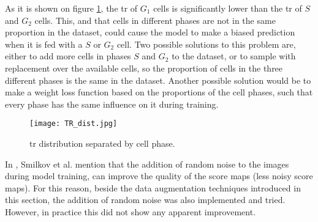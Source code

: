 As it is shown on figure \ref{fig:dataset:discus:tr_dist}, the \gls{tr} of $G_1$ cells is significantly lower than the \gls{tr} of $S$ and $G_2$ cells. This, and that cells in different phases are not in the same proportion in the dataset, could cause the model to make a biased prediction when it is fed with a $S$ or $G_2$ cell. Two possible solutions to this problem are, either to add more cells in phases $S$ and $G_2$ to the dataset, or to sample with replacement over the available cells, so the proportion of cells in the three different phases is the same in the dataset. Another possible solution would be to make a weight loss function based on the proportions of the cell phases, such that every phase has the same influence on it during training.

\begin{figure}[htb]
  \centering
  \texttt{[image: TR\_dist.jpg]}
  \caption{\gls{tr} distribution separated by cell phase.}
  \label{fig:dataset:discus:tr_dist}
\end{figure}

In \cite{Smilkov_smoothgrad}, Smilkov et al. mention that the addition of random noise to the images during model training, can improve the quality of the score maps (less noisy score maps). For this reason, beside the data augmentation techniques introduced in this section, the addition of random noise was also implemented and tried. However, in practice this did not show any apparent improvement.
